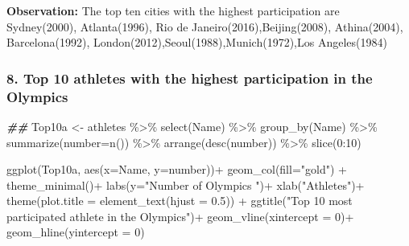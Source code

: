\documentclass[
]{article}
\newenvironment{Shaded}{\begin{snugshade}}{\end{snugshade}}
\newcommand{\AttributeTok}[1]{\textcolor[rgb]{0.77,0.63,0.00}{#1}}
\newcommand{\DecValTok}[1]{\textcolor[rgb]{0.00,0.00,0.81}{#1}}
\newcommand{\DocumentationTok}[1]{\textcolor[rgb]{0.56,0.35,0.01}{\textbf{\textit{#1}}}}
\newcommand{\FloatTok}[1]{\textcolor[rgb]{0.00,0.00,0.81}{#1}}
\newcommand{\FunctionTok}[1]{\textcolor[rgb]{0.00,0.00,0.00}{#1}}
\newcommand{\NormalTok}[1]{#1}
\newcommand{\OtherTok}[1]{\textcolor[rgb]{0.56,0.35,0.01}{#1}}
\newcommand{\SpecialCharTok}[1]{\textcolor[rgb]{0.00,0.00,0.00}{#1}}
\newcommand{\StringTok}[1]{\textcolor[rgb]{0.31,0.60,0.02}{#1}}
\begin{document}
\textbf{Observation:} The top ten cities with the highest participation
are Sydney(2000), Atlanta(1996), Rio de Janeiro(2016),Beijing(2008),
Athina(2004), Barcelona(1992), London(2012),Seoul(1988),Munich(1972),Los
Angeles(1984)

\hypertarget{top-10-athletes-with-the-highest-participation-in-the-olympics}{%
\subsubsection{8. Top 10 athletes with the highest participation in the
Olympics}\label{top-10-athletes-with-the-highest-participation-in-the-olympics}}

\begin{Shaded}
\begin{Highlighting}[]
\DocumentationTok{\#\#}
\NormalTok{Top10a }\OtherTok{\textless{}{-}}
\NormalTok{    athletes }\SpecialCharTok{\%\textgreater{}\%}
    \FunctionTok{select}\NormalTok{(Name) }\SpecialCharTok{\%\textgreater{}\%}
    \FunctionTok{group\_by}\NormalTok{(Name) }\SpecialCharTok{\%\textgreater{}\%}
    \FunctionTok{summarize}\NormalTok{(}\AttributeTok{number=}\FunctionTok{n}\NormalTok{())  }\SpecialCharTok{\%\textgreater{}\%}
    \FunctionTok{arrange}\NormalTok{(}\FunctionTok{desc}\NormalTok{(number)) }\SpecialCharTok{\%\textgreater{}\%}
    \FunctionTok{slice}\NormalTok{(}\DecValTok{0}\SpecialCharTok{:}\DecValTok{10}\NormalTok{)}

\FunctionTok{ggplot}\NormalTok{(Top10a, }\FunctionTok{aes}\NormalTok{(}\AttributeTok{x=}\NormalTok{Name, }\AttributeTok{y=}\NormalTok{number))}\SpecialCharTok{+}
\FunctionTok{geom\_col}\NormalTok{(}\AttributeTok{fill=}\StringTok{"gold"}\NormalTok{) }\SpecialCharTok{+}
\FunctionTok{theme\_minimal}\NormalTok{()}\SpecialCharTok{+}
\FunctionTok{labs}\NormalTok{(}\AttributeTok{y=}\StringTok{"Number of Olympics "}\NormalTok{)}\SpecialCharTok{+}
\FunctionTok{xlab}\NormalTok{(}\StringTok{"Athletes"}\NormalTok{)}\SpecialCharTok{+}
\FunctionTok{theme}\NormalTok{(}\AttributeTok{plot.title =} \FunctionTok{element\_text}\NormalTok{(}\AttributeTok{hjust =} \FloatTok{0.5}\NormalTok{)) }\SpecialCharTok{+}
\FunctionTok{ggtitle}\NormalTok{(}\StringTok{"Top 10 most participated athlete in the Olympics"}\NormalTok{)}\SpecialCharTok{+}
\FunctionTok{geom\_vline}\NormalTok{(}\AttributeTok{xintercept =} \DecValTok{0}\NormalTok{)}\SpecialCharTok{+}
\FunctionTok{geom\_hline}\NormalTok{(}\AttributeTok{yintercept =} \DecValTok{0}\NormalTok{)}
\end{Highlighting}
\end{Shaded}
\end{document}
